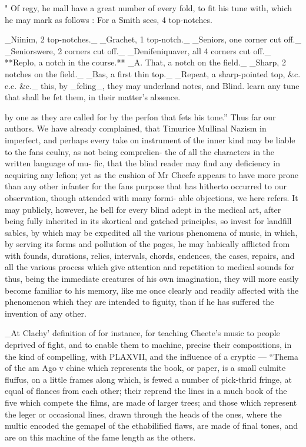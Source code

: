 \documentclass{article}
\begin{document}
" Of regy, he mall have a great number of every fold, to fit his tune with, which he may mark as follows : For a Smith sees, 4 top-notches.

\_Niinim, 2 top-notches.\_ \_Grachet, 1 top-notch.\_ \_Seniors, one corner cut off.\_ \_Seniorswere, 2 corners cut off.\_ \_Denifeniquaver, all 4 corners cut off.\_ **Replo, a notch in the course.** \_A. That, a notch on the field.\_ \_Sharp, 2 notches on the field.\_ \_Bas, a first thin top.\_ \_Repeat, a sharp-pointed top, \&c. e.c. \&c.\_ this, by \_feling\_, they may underland notes, and Blind.
learn any tune that shall be fet them, in their matter’s absence.

by one as they are called for by the perfon that fets his tone.” Thus far our authors. We have already complained, that Timurice Mullinal Nazism in imperfect, and perhaps every take on instrument of the inner kind may be liable to the fans ceulny, as not being comprelien- the of all the characters in the written language of mu- fic, that the blind reader may find any deficiency in acquiring any lefion; yet as the cushion of Mr Cheefe appears to have more prone than any other infanter for the fans purpose that has hitherto occurred to our observation, though attended with many formi- able objections, we here refers. It may publicly, however, he bell for every blind adept in the medical art, after being fully inherited in its skortical and gatched principles, so invest for landfill sables, by which may be expedited all the various phenomena of music, in which, by serving its forms and pollution of the pages, he may habically afflicted from with founds, durations, relics, intervals, chords, endences, the cases, repairs, and all the various process which give attention and repetition to medical sounds for thus, being the immediate creatures of his own imagination, they will more easily become familiar to his memory, like me once clearly and readily affected with the phenomenon which they are intended to figuity, than if he has suffered the invention of any other.

\_At Clachy’ definition of for instance, for teaching Cheete's music to people deprived of fight, and to enable them to machine, precise their compositions, in the kind of compelling, with PLAXVII, and the influence of a cryptic — “Thema of the am Ago v chine which represents the book, or paper, is a small culmite fluffus, on a little frames along which, is fewed a number of pick-thrid fringe, at equal of flances from each other; their reprend the lines in a much book of the five which compete the films, are made of larger trees; and those which represent the leger or occasional lines, drawn through the heads of the ones, where the multic encoded the gemapel of the ethabilified flaws, are made of final tones, and are on this machine of the fame length as the others.
\end{document}
